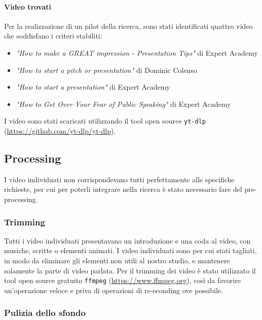 \paragraph{Video trovati}

Per la realizzazione di un pilot della ricerca, sono stati identificati quattro video che soddisfano i criteri stabiliti:
\begin{itemize}
    \item \textit{"How to make a GREAT impression - Presentation Tips"} di Expert Academy %
    \item \textit{"How to start a pitch or presentation"} di Dominic Colenso %
    \item \textit{"How to start a presentation"} di Expert Academy %
    \item \textit{"How to Get Over Your Fear of Public Speaking"} di Expert Academy %
\end{itemize}

I video sono stati scaricati utilizzando il tool open source \verb|yt-dlp| (\url{https://github.com/yt-dlp/yt-dlp}).

\subsection{Processing}

I video individuati non corrispondevano tutti perfettamente alle specifiche richieste, per cui per poterli integrare nella ricerca è stato necessario fare del pre-processing.

\subsubsection{Trimming}

Tutti i video individuati presentavano un introduzione e una coda al video, con musiche, scritte o elementi animati. I video individuati sono per cui stati tagliati, in modo da eliminare gli elementi non utili al nostro studio, e mantenere solamente la parte di video parlata. Per il trimming dei video è stato utilizzato il tool open source gratuito \verb|ffmpeg| (\url{https://www.ffmpeg.org}), così da favorire un'operazione veloce e priva di operazioni di re-econding ove possibile.

\subsubsection{Pulizia dello sfondo}

